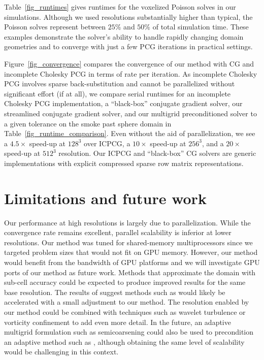 Table~\ref{fig_runtimes} gives runtimes for the voxelized Poisson solves in our simulations.  Although we used resolutions substantially higher than typical, the Poisson solves represent between $25\%$ and $50\%$ of total simulation time. 
These examples demonstrate the solver's ability to handle rapidly changing domain geometries and to converge with just a few PCG iterations in practical
settings. 

Figure~\ref{fig_convergence} compares the convergence of our method with CG and incomplete Cholesky PCG in terms of rate per iteration. As incomplete Cholesky PCG involves sparse back-substitution and cannot be parallelized without significant effort (if at all), we compare serial runtimes for an incomplete Cholesky PCG implementation, a ``black-box'' conjugate gradient solver, our streamlined conjugate gradient solver, and our multigrid preconditioned solver to a given tolerance on the smoke past sphere domain in Table~\ref{fig_runtime_comparison}.  Even without the aid of parallelization, we see a $4.5\times$ speed-up at $128^3$ over ICPCG, a $10\times$ speed-up at $256^3$, and a $20\times$ speed-up at $512^3$ resolution.  Our ICPCG and ``black-box'' CG solvers are generic implementations with explicit compressed sparse row matrix representations.

\section{Limitations and future work}
\label{sec_discussion}
Our performance at high resolutions is largely due to parallelization. While the convergence rate remains excellent, parallel scalability is inferior at lower resolutions. Our method was tuned
for shared-memory multiprocessors since we targeted problem sizes that would not fit on GPU memory. However, our method would benefit from the bandwidth of GPU platforms and we will
investigate GPU ports of our method as future work. Methods that approximate the domain with sub-cell accuracy could be expected to produce improved results for the same base resolution. The results of \cite{SW05} suggest methods such as
 \cite{BBB07} would likely be accelerated with a small adjustment to our method. The resolution enabled by our method could be combined with techniques such as wavelet turbulence
 \cite{KTJG08} or vorticity confinement \cite{FSJ01} to add even more detail. In the future, an adaptive multigrid formulation such as semicoarsening \cite{trottenberg:2001:multigrid}
 could also be used to precondition an adaptive method such as \cite{LGF04}, although obtaining the same level of scalability would be challenging in this context.

